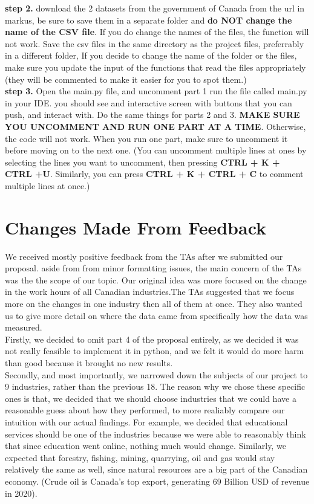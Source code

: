 \documentclass[fontsize=11pt]{article}
\begin{document}
\textbf{step 2.}
download the 2 datasets from the government of Canada from the url in markus, be sure to save them in a separate folder and \textbf{do NOT change the name of the CSV file}. If you do change the names of the files, the function will not work. Save the csv files in the same directory as the project files, preferrably in a different folder, If you decide to change the name of the folder or the files, make sure you update the input of the functions that read the files appropriately (they will be commented to make it easier for you to spot them.)  \\
 
\textbf{step 3.} Open the main.py file, and uncomment part 1
run the file called main.py in your IDE.
you should see and interactive screen with buttons that you can push, and interact with. 
Do the same things for parts 2 and 3. \textbf{MAKE SURE YOU UNCOMMENT AND RUN ONE PART AT A TIME}. Otherwise, the code will not work. When you run one part, make sure to uncomment it before moving on to the next one. (You can uncomment multiple lines at ones by selecting the lines you want to uncomment, then pressing \textbf{CTRL + K + CTRL +U}. Similarly, you can press \textbf{CTRL + K + CTRL + C} to comment multiple lines at once.)
 
\section*{Changes Made From Feedback}  

We received mostly positive feedback from the TAs after we submitted our proposal. aside from from minor formatting issues, the main concern of the TAs was the the scope of our topic. Our original idea was more focused on the change in the work hours of all Canadian industries.The TAs suggested that we focus more on the changes in one industry then all of them at once. They also wanted us to give more detail on where the data came from specifically how the data was measured. \\

Firstly, we decided to omit part 4 of the proposal entirely, as we decided it was not really feasible to implement it in python, and we felt it would do more harm than good because it brought no new results. \\
 
Secondly, and most importantly, we narrowed down the subjects of our project to 9 industries, rather than the previous 18.  The  reason why we chose these specific ones is that, we decided that we should choose industries that we could have a reasonable guess about how they performed, to more realiably compare our intuition with our actual findings. For example, we decided that educational services should be one of the industries because we were able to reasonably think that since education went online, nothing much would change. Similarly, we expected that forestry, fishing, mining, quarrying, oil and gas would stay relatively the same as well, since natural resources are a big part of the Canadian economy. (Crude oil is Canada's top export, generating 69 Billion USD of revenue in 2020).\\
\end{document}
